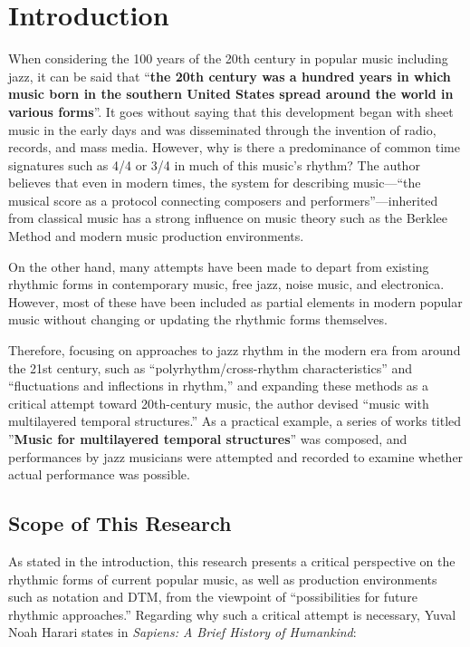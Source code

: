 \section{Introduction}
When considering the 100 years of the 20th century in popular music including jazz, it can be said that ``{\bf the 20th century was a hundred years in which music born in the southern United States spread around the world in various forms}''\cite{murai:01}. It goes without saying that this development began with sheet music in the early days and was disseminated through the invention of radio, records, and mass media. However, why is there a predominance of common time signatures such as 4/4 or 3/4 in much of this music's rhythm? The author believes that even in modern times, the system for describing music—``the musical score as a protocol connecting composers and performers''—inherited from classical music has a strong influence on music theory such as the Berklee Method and modern music production environments.

On the other hand, many attempts have been made to depart from existing rhythmic forms in contemporary music, free jazz, noise music, and electronica. However, most of these have been included as partial elements in modern popular music without changing or updating the rhythmic forms themselves.

Therefore, focusing on approaches to jazz rhythm in the modern era from around the 21st century, such as ``polyrhythm/cross-rhythm characteristics'' and ``fluctuations and inflections in rhythm,'' and expanding these methods as a critical attempt toward 20th-century music, the author devised ``music with multilayered temporal structures.'' As a practical example, a series of works titled ''{\bf Music for multilayered temporal structures}''\cite{yamato:01} was composed, and performances by jazz musicians were attempted and recorded to examine whether actual performance was possible.

\subsection{Scope of This Research \label{research_target}}
As stated in the introduction, this research presents a critical perspective on the rhythmic forms of current popular music, as well as production environments such as notation and DTM, from the viewpoint of ``possibilities for future rhythmic approaches.'' Regarding why such a critical attempt is necessary, Yuval Noah Harari states in \textit{Sapiens: A Brief History of Humankind}:\\

